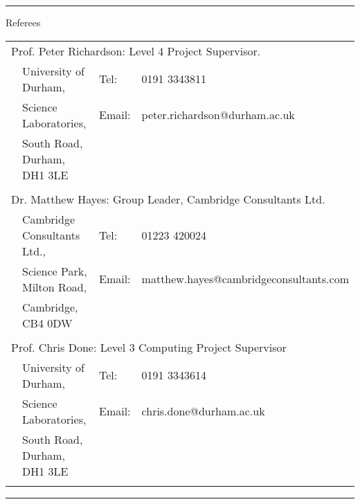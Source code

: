 \documentclass[11pt,a4paper]{article}
\makeatletter
\newcommand{\wa}{.12}	%
\newcommand{\wb}{.83}	%
\newenvironment{tablehere}
	{\def\@captype{table}}
	{}
\makeatother
\begin{document}
\hrule\vspace{0.2cm}
\sc Referees \rm

\sc\footnotesize

\begin{tablehere}
\begin{tabular}{p{\wa\textwidth} p{} p{} p{}}
	\multicolumn{4}{p{\wb\textwidth}}{\normalsize Prof$.$ Peter Richardson: \; Level 4 Project Supervisor.}				\\
		& 	University of Durham,			&	Tel:		&		0191 3343811							\\
		&	Science Laboratories,			&	Email:	&\rm		peter.richardson@durham.ac.uk			\\
		&	South Road, Durham, DH1 3LE	&			&											\\\\
	\multicolumn{4}{p{\wb\textwidth}}{\normalsize Dr$.$ Matthew Hayes: \; Group Leader, Cambridge Consultants Ltd.}	\\
		& 	Cambridge Consultants Ltd.,		&	Tel:		&		01223 420024							\\
		&	Science Park, Milton Road,		&	Email:	&\rm		matthew.hayes@cambridgeconsultants.com	\\
		&	Cambridge, CB4 0DW			&			&											\\\\
	\multicolumn{4}{p{\wb\textwidth}}{\normalsize Prof$.$ Chris Done: \; Level 3 Computing Project Supervisor}			\\
		& 	University of Durham,			&	Tel:		&		0191 3343614							\\
		&	Science Laboratories,			&	Email:	&\rm		chris.done@durham.ac.uk				\\
		&	South Road, Durham, DH1 3LE	&			&											\\\\
\end{tabular}
\end{tablehere}
\hrule
\end{document}
